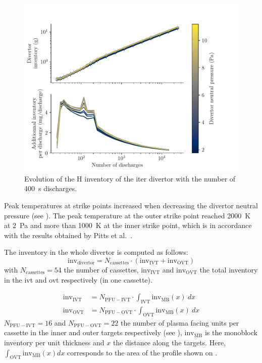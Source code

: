 \begin{figure}[h!]
    \centering
    \includegraphics[width=\linewidth]{Figures/Chapter4/ITER/inventory_vs_time.pdf}
    \caption{Evolution of the \gls{H} \gls{inventory} of the \gls{iter} \gls{divertor} with the number of \SI{400}{s} discharges.}
\end{figure}


Peak temperatures at \glspl{strike point} increased when decreasing the \gls{divertor} neutral pressure (see ).
The peak temperature at the outer strike point reached \SI{2000}{K} at \SI{2}{Pa} and more than \SI{1000}{K} at the inner strike point, which is in accordance with the results obtained by Pitts et al.\ .

The \gls{inventory} in the whole \gls{divertor} is computed as follows:
\begin{equation}
    \mathrm{inv_{divertor}} = N_\mathrm{cassettes} \cdot (\mathrm{inv_{IVT}} + \mathrm{inv_{OVT}})
\end{equation}
with $N_\mathrm{cassettes}=54$ the number of cassettes, $\mathrm{inv_{IVT}}$ and $\mathrm{inv_{OVT}}$ the total \gls{inventory} in the \gls{ivt} and \gls{ovt} respectively (in one cassette).

\begin{align}
    \mathrm{inv_{IVT}} &= N_\mathrm{PFU-IVT} \cdot \int_\mathrm{IVT} \mathrm{inv_{MB}}(x)\: dx \\
    \mathrm{inv_{OVT}} &= N_\mathrm{PFU-OVT} \cdot \int_\mathrm{OVT} \mathrm{inv_{MB}}(x)\: dx
\end{align}
$N_\mathrm{PFU-IVT}=16$ and $N_\mathrm{PFU-OVT}=22$ the number of plasma facing units per cassette in the inner and outer targets respectively (see ), $\mathrm{inv_{MB}}$ is the \gls{monoblock} \gls{inventory} per unit thickness and $x$ the distance along the targets.
Here, $\int_\mathrm{OVT} \mathrm{inv_{MB}}(x) dx$ corresponds to the area of the profile shown on .

